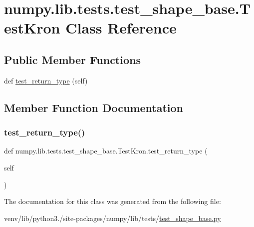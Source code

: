\hypertarget{classnumpy_1_1lib_1_1tests_1_1test__shape__base_1_1TestKron}{}\section{numpy.\+lib.\+tests.\+test\+\_\+shape\+\_\+base.\+Test\+Kron Class Reference}
\label{classnumpy_1_1lib_1_1tests_1_1test__shape__base_1_1TestKron}
\subsection*{Public Member Functions}
\begin{DoxyCompactItemize}
\item 
def \hyperlink{classnumpy_1_1lib_1_1tests_1_1test__shape__base_1_1TestKron_a4dd912beea1ca19d417e1baf946d962f}{test\+\_\+return\+\_\+type} (self)
\end{DoxyCompactItemize}


\subsection{Member Function Documentation}
\mbox{\label{classnumpy_1_1lib_1_1tests_1_1test__shape__base_1_1TestKron_a4dd912beea1ca19d417e1baf946d962f}} 
\subsubsection{\texorpdfstring{test\+\_\+return\+\_\+type()}{test\_return\_type()}}
{\footnotesize\ttfamily def numpy.\+lib.\+tests.\+test\+\_\+shape\+\_\+base.\+Test\+Kron.\+test\+\_\+return\+\_\+type (\begin{DoxyParamCaption}\item[{}]{self }\end{DoxyParamCaption})}



The documentation for this class was generated from the following file\+:\begin{DoxyCompactItemize}
\item 
venv/lib/python3./site-\/packages/numpy/lib/tests/\hyperlink{lib_2tests_2test__shape__base_8py}{test\+\_\+shape\+\_\+base.\+py}\end{DoxyCompactItemize}
